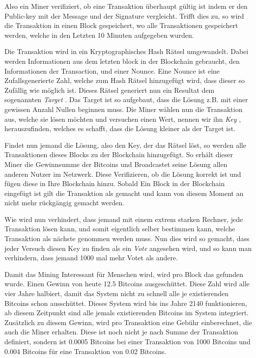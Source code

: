\noindent
Also ein Miner verifiziert, ob eine Transaktion überhaupt gültig ist indem er den Public-key mit der Message und der Signature vergleicht. Trifft dies zu, so wird die Transaktion in einen Block gespeichert,
wo alle Transaktionen gespeichert werden, welche in den Letzten 10 Minuten aufgegeben wurden.

\noindent
Die Transaktion wird in ein Kryptographisches Hash Rätsel umgewandelt. Dabei werden Informationen aus dem letzten block in der Blockchain gebraucht, den Informationen der Transaction, und einer Nounce.
Eine Nounce ist eine Zufallsgenerierte Zahl, welche zum Hash Rätsel hinzugefügt wird, dass dieser so Zufällig wie möglich ist. Dieses Rätsel generiert nun ein Resultat dem sogenannten \emph{\dq Target \dq}.
Das Target ist so aufgebaut, dass die Lösung z.B. mit einer gewissen Anzahl Nullen beginnen muss. Die Miner wählen nun die Transaktion aus, welche sie lösen möchten und versuchen einen Wert, nennen wir ihn
\emph{\dq Key \dq}, herauszufinden, welches es schafft, dass die Lösung kleiner als der Target ist.

\noindent
Findet nun jemand die Lösung, also den Key, der das Rätsel löst, so werden alle Transaktionen dieses Blocks zu der Blockchain hinzugefügt. So erhält dieser Miner die Gewinnsumme der Bitcoins und Broadcastet
seine Lösung allen anderen Nutzer im Netzwerk. Diese Verifizieren, ob die Lösung korrekt ist und fügen diese in Ihre Blockchain hinzu. Sobald Ein Block in der Blockchain eingefügt ist gilt die Transaktion
als gemacht und kann von diesem Moment an nicht mehr rückgängig gemacht werden.

\noindent
Wie wird nun verhindert, dass jemand mit einem extrem starken Rechner, jede Transaktion lösen kann, und somit eigentlich selber bestimmen kann, welche Transaktion als nächste genommen werden muss.
Nun dies wird so gemacht, dass jeder Versuch diesen Key zu finden als ein \emph{\dq Vote \dq} angesehen wird, und so kann man verhindern, dass jemand 1000 mal mehr Votet als andere.

\noindent
Damit das Mining Interessant für Menschen wird, wird pro Block das gefunden wurde. Einen Gewinn von heute 12.5 Bitcoins ausgeschüttet. Diese Zahl wird alle vier Jahre halbiert, damit das System nicht
zu schnell alle je existierenden Bitcoins schon ausschüttet. Dieses System wird bis ins Jahre 2140 funktionieren, ab diesem Zeitpunkt sind alle jemals existierenden Bitcoins im System integriert.
Zusätzlich zu diesem Gewinn, wird pro Transaktion eine Gebühr einberechnet, die auch die Miner erhalten. Diese ist noch nicht je nach Summe der Transaktion definiert, sondern ist 0.0005 Bitcoins bei
einer Transaktion von 1000 Bitcoins und 0.004 Bitcoins für eine Transaktion von 0.02 Bitcoins.
